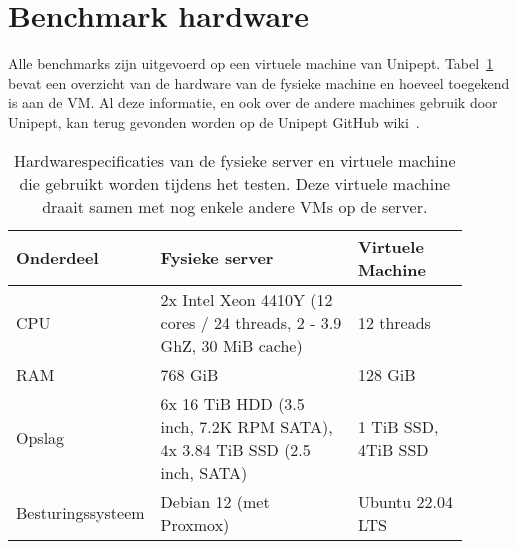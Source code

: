 \section{Benchmark hardware}\label{sec:benchmark-hardware}
Alle benchmarks zijn uitgevoerd op een virtuele machine van Unipept.
Tabel~\ref{tab:Matt_hardware} bevat een overzicht van de hardware van de fysieke machine en hoeveel toegekend is aan de VM\@.
Al deze informatie, en ook over de andere machines gebruik door Unipept, kan terug gevonden worden op de Unipept GitHub wiki~\cite{unipept_infrastructure}.

\begin{table}[h!]
    \centering
    \begin{tabular}{p{0.20\linewidth}p{0.45\linewidth}p{0.25\linewidth}}
        Onderdeel         & Fysieke server                                                            & Virtuele Machine    \\
        \hline\hline
        CPU               & 2x Intel Xeon 4410Y (12 cores / 24 threads, 2 - 3.9 GhZ, 30 MiB cache)    & 12 threads          \\
        RAM               & 768 GiB                                                                   & 128 GiB             \\
        Opslag            & 6x 16 TiB HDD (3.5 inch, 7.2K RPM SATA), 4x 3.84 TiB SSD (2.5 inch, SATA) & 1 TiB SSD, 4TiB SSD \\
        Besturingssysteem & Debian 12 (met Proxmox)                                                   & Ubuntu 22.04 LTS    \\
        \hline
    \end{tabular}
    \caption{Hardwarespecificaties van de fysieke server en virtuele machine die gebruikt worden tijdens het testen. Deze virtuele machine draait samen met nog enkele andere VMs op de server.}
    \label{tab:Matt_hardware}
\end{table}

